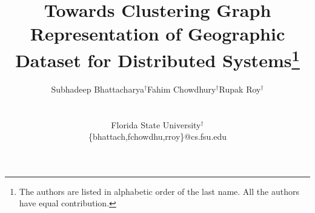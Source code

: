 \title{
    Towards Clustering Graph Representation of Geographic Dataset for Distributed Systems\thanks{The authors are listed in alphabetic order of the last name. All the authors have equal contribution.}\\
}

\author{
    \begin{tabular}{ccc}
    Subhadeep Bhattacharya$^\dag$ & Fahim Chowdhury$^\dag$ & Rupak Roy$^\dag$\\
    \end{tabular}  \\
    \begin{tabular}{c}
    Florida State University$^\dag$ \\
    {\{bhattach,fchowdhu,rroy\}@cs.fsu.edu} \\
    \end{tabular}
}



\maketitle

\IEEEpeerreviewmaketitle